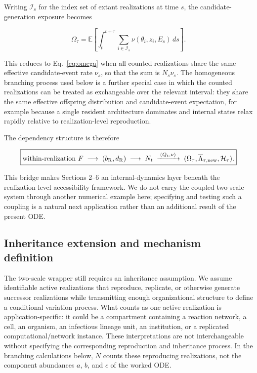 \documentclass[11pt,a4paper]{article}
\begin{document}
Writing $\mathcal I_s$ for the index set of extant realizations at time $s$, the candidate-generation exposure becomes

\begin{equation}
\boxed{
\Omega_\tau
=
\mathbb E\!\left[
\int_t^{t+\tau}
\sum_{i\in\mathcal I_s}
\nu(\theta_i,z_i,E_s)\,ds
\right].
}
\label{eq:omega-two-scale}
\end{equation}

This reduces to Eq.~\eqref{eq:omega} when all counted realizations share the same effective candidate-event rate $\nu_s$, so that the sum is $N_s\nu_s$. The homogeneous branching process used below is a further special case in which the counted realizations can be treated as exchangeable over the relevant interval: they share the same effective offspring distribution and candidate-event expectation, for example because a single resident architecture dominates and internal states relax rapidly relative to realization-level reproduction.

The dependency structure is therefore

\begin{equation*}
\boxed{
\text{within-realization }F
\;\longrightarrow\;
(b_{\rm R},d_{\rm R})
\;\longrightarrow\;
N_t
\;\xrightarrow{\;(Q_t,\nu)\;}\;
(\Omega_\tau,\overline\Lambda_{\tau,\rm new},\mathcal H_\tau).
}
\end{equation*}

This bridge makes Sections 2--6 an internal-dynamics layer beneath the realization-level accessibility framework. We do not carry the coupled two-scale system through another numerical example here; specifying and testing such a coupling is a natural next application rather than an additional result of the present ODE.

\subsection{Inheritance extension and mechanism definition}

The two-scale wrapper still requires an inheritance assumption. We assume identifiable active realizations that reproduce, replicate, or otherwise generate successor realizations while transmitting enough organizational structure to define a conditional variation process. What counts as one active realization is application-specific: it could be a compartment containing a reaction network, a cell, an organism, an infectious lineage unit, an institution, or a replicated computational/network instance. These interpretations are not interchangeable without specifying the corresponding reproduction and inheritance process. In the branching calculations below, $N$ counts these reproducing realizations, not the component abundances $a$, $b$, and $c$ of the worked ODE.
\end{document}
